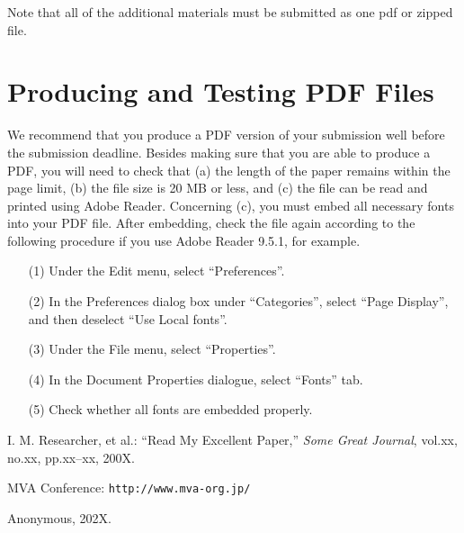 \documentclass{mva_style}
\begin{document}
Note that all of the additional materials must be submitted as one pdf or zipped file.

\section{Producing and Testing PDF Files}
We recommend that you produce a PDF version of 
your submission well before the submission deadline. 
Besides making sure that you are able to produce a PDF, 
you will need to check that 
(a) the length of the paper remains within the page limit, 
(b) the file size is 20 MB or less, 
and (c) the file can be read and printed using Adobe Reader. 
Concerning (c), you must embed all necessary fonts into your PDF file. 
After embedding, check the file again according to 
the following procedure if you use Adobe Reader 9.5.1, for example.

\begin{itemize}
\item[(1)] Under the Edit menu, select ``Preferences''.
\item[(2)] In the Preferences dialog box under ``Categories'',
  select ``Page Display'', and then deselect ``Use Local fonts''.
\item[(3)] Under the File menu, select ``Properties''.
\item[(4)] In the Document Properties dialogue, select ``Fonts'' tab.
\item[(5)] Check whether all fonts are embedded properly.
\end{itemize}


\begin{thebibliography}{99}

  I. M. Researcher, et al.: 
  ``Read My Excellent Paper,'' 
  \textit{Some Great Journal}, vol.xx, no.xx, pp.xx--xx, 200X.

  MVA Conference: {\tt http://www.mva-org.jp/}

Anonymous, 202X.

\end{thebibliography}
\end{document}
